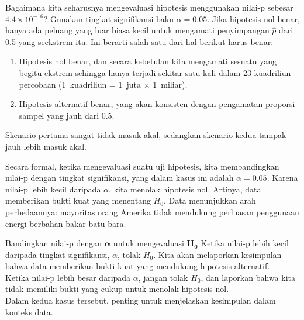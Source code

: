 \begin{examplewrap}
\begin{nexample}{Bagaimana kita seharusnya mengevaluasi hipotesis menggunakan
    nilai-p sebesar $4.4 \times 10^{-16}$?
    Gunakan tingkat signifikansi baku $\alpha = 0.05$.}
  Jika hipotesis nol benar, hanya ada peluang yang luar biasa
  kecil untuk mengamati penyimpangan
  $\hat{p}$ dari 0.5
  yang seekstrem itu.
  Ini berarti salah satu dari hal berikut harus benar:
  \begin{enumerate}
    \item Hipotesis nol benar, dan secara kebetulan kita
        mengamati sesuatu yang begitu ekstrem sehingga hanya terjadi
        sekitar satu kali dalam 23 kuadriliun percobaan
        (1~kuadriliun = 1~juta $\times$ 1~miliar).
    \item Hipotesis alternatif benar,
        yang akan konsisten
        dengan pengamatan proporsi sampel yang jauh dari 0.5.
  \end{enumerate}
  Skenario pertama sangat tidak masuk akal,
  sedangkan skenario kedua tampak jauh lebih masuk akal.

  Secara formal, ketika mengevaluasi suatu uji hipotesis,
  kita membandingkan nilai-p dengan tingkat signifikansi,
  yang dalam kasus ini adalah $\alpha = 0.05$.
  Karena nilai-p lebih kecil daripada $\alpha$,
  kita menolak hipotesis nol.
  Artinya, data memberikan bukti kuat yang menentang $H_0$.
  Data menunjukkan arah perbedaannya:
  mayoritas orang Amerika tidak mendukung
  perluasan penggunaan energi berbahan bakar batu bara.
\end{nexample}
\end{examplewrap}


\begin{onebox}{Bandingkan nilai-p dengan $\pmb{\alpha}$ untuk
      mengevaluasi $\pmb{H_0}$}
  Ketika nilai-p lebih kecil daripada tingkat signifikansi, $\alpha$,
  tolak $H_0$. Kita akan melaporkan kesimpulan bahwa data memberikan
  bukti kuat yang mendukung hipotesis alternatif. \\[2mm]
  Ketika nilai-p lebih besar daripada $\alpha$, jangan tolak $H_0$,
  dan laporkan bahwa kita tidak memiliki bukti yang cukup untuk menolak
  hipotesis nol. \\[2mm]
  Dalam kedua kasus tersebut, penting untuk menjelaskan kesimpulan
  dalam konteks data.
\end{onebox}






